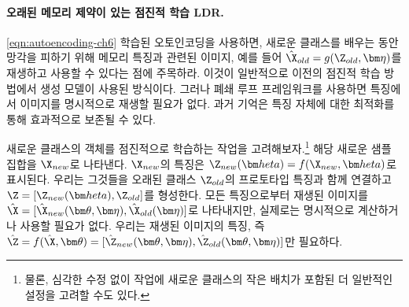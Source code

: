 \documentclass[../../book-main_ko.tex]{subfiles}
\begin{document}
\paragraph{오래된 메모리 제약이 있는 점진적 학습 LDR.}
\eqref{eqn:autoencoding-ch6} 학습된 오토인코딩을 사용하면, 새로운 클래스를 배우는 동안 망각을 피하기 위해 메모리 특징과 관련된 이미지, 예를 들어 $\hat\X_{old} = g(\Z_{old}, \bm \eta)$를 재생하고 사용할 수 있다는 점에 주목하라. 이것이 일반적으로 이전의 점진적 학습 방법에서 생성 모델이 사용된 방식이다. 그러나 폐쇄 루프 프레임워크를 사용하면 특징에서 이미지를 명시적으로 재생할 필요가 없다. 과거 기억은 특징 자체에 대한 최적화를 통해 효과적으로 보존될 수 있다.

새로운 클래스의 객체를 점진적으로 학습하는 작업을 고려해보자.\footnote{물론, 심각한 수정 없이 작업에 새로운 클래스의 작은 배치가 포함된 더 일반적인 설정을 고려할 수도 있다.} 해당 새로운 샘플 집합을 $\X_{new}$로 나타낸다. $\X_{new}$의 특징은 $\Z_{new}(\bm 	heta) = f(\X_{new}, \bm 	heta)$로 표시된다. 우리는 그것들을 오래된 클래스 $\Z_{old}$의 프로토타입 특징과 함께 연결하고 $\Z = [\Z_{new}(\bm 	heta), \Z_{old}]$를 형성한다. 모든 특징으로부터 재생된 이미지를 $\hat{\X} = [{\hat{\X}_{new}(\bm \theta,\bm \eta)}, {\hat{\X}_{old}(\bm \eta)}]$로 나타내지만, 실제로는 명시적으로 계산하거나 사용할 필요가 없다. 우리는 재생된 이미지의 특징, 즉 $\hat{\Z} = f(\hat{\X}, \bm \theta) =  [{\hat{\Z}_{new}(\bm \theta,\bm \eta)}, {\hat{\Z}_{old}(\bm \theta,\bm \eta)}]$만 필요하다.
\end{document}
